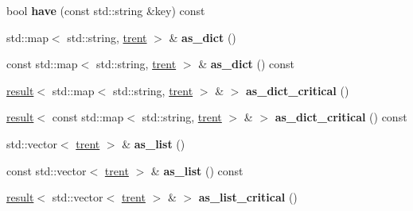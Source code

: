 \begin{DoxyCompactItemize}
\item 
bool {\bfseries have} (const std\+::string \&key) const \hypertarget{classgxx_1_1trent_a3420e2d3923802d0217c450f57ccbf57}{}\label{classgxx_1_1trent_a3420e2d3923802d0217c450f57ccbf57}

\item 
std\+::map$<$ std\+::string, \hyperlink{classgxx_1_1trent}{trent} $>$ \& {\bfseries as\+\_\+dict} ()\hypertarget{classgxx_1_1trent_a579e26f02ad034f09f142d29a97990bf}{}\label{classgxx_1_1trent_a579e26f02ad034f09f142d29a97990bf}

\item 
const std\+::map$<$ std\+::string, \hyperlink{classgxx_1_1trent}{trent} $>$ \& {\bfseries as\+\_\+dict} () const \hypertarget{classgxx_1_1trent_a282fcd5c6b0fad0dad9d5108e3adcf6a}{}\label{classgxx_1_1trent_a282fcd5c6b0fad0dad9d5108e3adcf6a}

\item 
\hyperlink{classgxx_1_1result__type_1_1result}{result}$<$ std\+::map$<$ std\+::string, \hyperlink{classgxx_1_1trent}{trent} $>$ \& $>$ {\bfseries as\+\_\+dict\+\_\+critical} ()\hypertarget{classgxx_1_1trent_a431e089b0008ec412a80ed2221f51a7a}{}\label{classgxx_1_1trent_a431e089b0008ec412a80ed2221f51a7a}

\item 
\hyperlink{classgxx_1_1result__type_1_1result}{result}$<$ const std\+::map$<$ std\+::string, \hyperlink{classgxx_1_1trent}{trent} $>$ \& $>$ {\bfseries as\+\_\+dict\+\_\+critical} () const \hypertarget{classgxx_1_1trent_a6785573d6172f4f744fa591f48d87153}{}\label{classgxx_1_1trent_a6785573d6172f4f744fa591f48d87153}

\item 
std\+::vector$<$ \hyperlink{classgxx_1_1trent}{trent} $>$ \& {\bfseries as\+\_\+list} ()\hypertarget{classgxx_1_1trent_ac4ad33e79b740d6703608b8e1a071b17}{}\label{classgxx_1_1trent_ac4ad33e79b740d6703608b8e1a071b17}

\item 
const std\+::vector$<$ \hyperlink{classgxx_1_1trent}{trent} $>$ \& {\bfseries as\+\_\+list} () const \hypertarget{classgxx_1_1trent_ac85b37e3aabdb3c886b27b0aaf57fd71}{}\label{classgxx_1_1trent_ac85b37e3aabdb3c886b27b0aaf57fd71}

\item 
\hyperlink{classgxx_1_1result__type_1_1result}{result}$<$ std\+::vector$<$ \hyperlink{classgxx_1_1trent}{trent} $>$ \& $>$ {\bfseries as\+\_\+list\+\_\+critical} ()\hypertarget{classgxx_1_1trent_adf380b571450bfa63b3c36a418725083}{}\label{classgxx_1_1trent_adf380b571450bfa63b3c36a418725083}


\end{DoxyCompactItemize}
